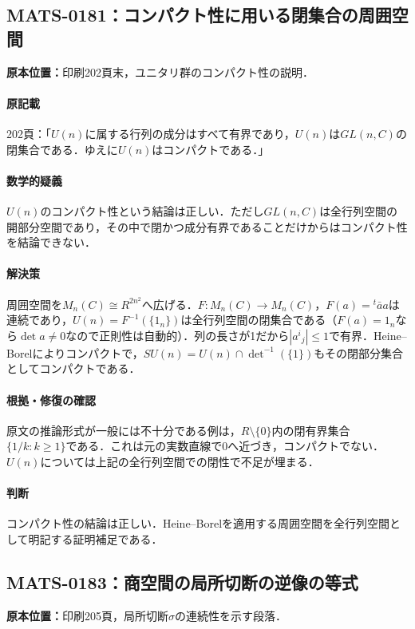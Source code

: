 \documentclass[a4paper,10pt]{ltjsarticle}
\begin{document}
\subsection*{MATS-0181：コンパクト性に用いる閉集合の周囲空間}\label{math:MATS-0181}
\noindent\textbf{原本位置：}印刷202頁末，ユニタリ群のコンパクト性の説明．

\paragraph{原記載}202頁：「$U(n)$に属する行列の成分はすべて有界であり，$U(n)$は$GL(n,C)$の閉集合である．ゆえに$U(n)$はコンパクトである．」

\paragraph{数学的疑義}$U(n)$のコンパクト性という結論は正しい．ただし$GL(n,C)$は全行列空間の開部分空間であり，その中で閉かつ成分有界であることだけからはコンパクト性を結論できない．

\paragraph{解決策}周囲空間を$M_n(C)\cong R^{2n^2}$へ広げる．$F:M_n(C)\to M_n(C)$，$F(a)={}^t\bar a a$は連続であり，$U(n)=F^{-1}(\{1_n\})$は全行列空間の閉集合である（$F(a)=1_n$なら$\det a\ne0$なので正則性は自動的）．列の長さが1だから$|a^i{}_j|\le1$で有界．Heine--Borelによりコンパクトで，$SU(n)=U(n)\cap\det^{-1}(\{1\})$もその閉部分集合としてコンパクトである．

\paragraph{根拠・修復の確認}原文の推論形式が一般には不十分である例は，$R\setminus\{0\}$内の閉有界集合$\{1/k:k\ge1\}$である．これは元の実数直線で0へ近づき，コンパクトでない．$U(n)$については上記の全行列空間での閉性で不足が埋まる．

\paragraph{判断}コンパクト性の結論は正しい．Heine--Borelを適用する周囲空間を全行列空間として明記する証明補足である．


\subsection*{MATS-0183：商空間の局所切断の逆像の等式}\label{math:MATS-0183}
\noindent\textbf{原本位置：}印刷205頁，局所切断$\sigma$の連続性を示す段落．
\end{document}
